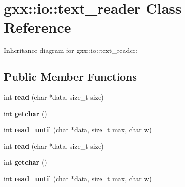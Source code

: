 \hypertarget{classgxx_1_1io_1_1text__reader}{}\section{gxx\+:\+:io\+:\+:text\+\_\+reader Class Reference}
\label{classgxx_1_1io_1_1text__reader}


Inheritance diagram for gxx\+:\+:io\+:\+:text\+\_\+reader\+:
\subsection*{Public Member Functions}
\begin{DoxyCompactItemize}
\item 
int {\bfseries read} (char $\ast$data, size\+\_\+t size)\hypertarget{classgxx_1_1io_1_1text__reader_a63e842efd622641294d74144e8c1d593}{}\label{classgxx_1_1io_1_1text__reader_a63e842efd622641294d74144e8c1d593}

\item 
int {\bfseries getchar} ()\hypertarget{classgxx_1_1io_1_1text__reader_a4a66678826b1a46f9e0ca2369347ddfa}{}\label{classgxx_1_1io_1_1text__reader_a4a66678826b1a46f9e0ca2369347ddfa}

\item 
int {\bfseries read\+\_\+until} (char $\ast$data, size\+\_\+t max, char w)\hypertarget{classgxx_1_1io_1_1text__reader_a8ae70d7befaa52a3559d7d24eb2d9d55}{}\label{classgxx_1_1io_1_1text__reader_a8ae70d7befaa52a3559d7d24eb2d9d55}

\item 
int {\bfseries read} (char $\ast$data, size\+\_\+t size)\hypertarget{classgxx_1_1io_1_1text__reader_a63e842efd622641294d74144e8c1d593}{}\label{classgxx_1_1io_1_1text__reader_a63e842efd622641294d74144e8c1d593}

\item 
int {\bfseries getchar} ()\hypertarget{classgxx_1_1io_1_1text__reader_a4a66678826b1a46f9e0ca2369347ddfa}{}\label{classgxx_1_1io_1_1text__reader_a4a66678826b1a46f9e0ca2369347ddfa}

\item 
int {\bfseries read\+\_\+until} (char $\ast$data, size\+\_\+t max, char w)\hypertarget{classgxx_1_1io_1_1text__reader_a8ae70d7befaa52a3559d7d24eb2d9d55}{}\label{classgxx_1_1io_1_1text__reader_a8ae70d7befaa52a3559d7d24eb2d9d55}

\end{DoxyCompactItemize}
